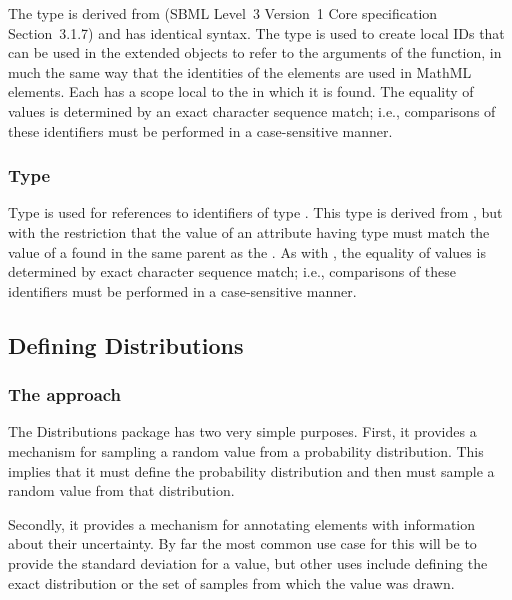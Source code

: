 \documentclass[draftspec]{sbmlpkgspec}
\newcommand{\fixttspace}{\hspace*{1pt}}
\newcommand{\sbmlthreecore}{SBML Level~3 Version~1 Core\xspace}
\newcommand{\distrib}{Distributions\xspace}
\begin{document}
The type  is derived from  (\sbmlthreecore specification Section~3.1.7) and has identical syntax.  The  type is used to create local IDs that can be used in the extended \FunctionDefinition objects to refer to the arguments of the function, in much the same way that the identities of the  elements are used in MathML  elements.  Each  has a scope local to the \FunctionDefinition in which it is found.  The
equality of  values is determined by an exact
character sequence match; i.e., comparisons of these identifiers must be
performed in a case-sensitive manner.


\subsubsection{Type \fixttspace{}}
\label{primtype-portidref}

Type  is used for references to
identifiers of type .  This type is derived from
, but with the restriction that the value of an
attribute having type  must match the value of a
 found in the same parent \FunctionDefinition as the
.  As with , the equality of
 values is determined by exact character sequence
match; i.e., comparisons of these identifiers must be performed in a
case-sensitive manner.



\subsection{Defining Distributions}

\subsubsection{The approach}

The \distrib package has two very simple purposes. First, it provides a
mechanism for sampling a random value from a probability
distribution. This implies that it must define the probability distribution and then must sample a
random value from that distribution.

Secondly, it provides a mechanism for annotating elements with information about their uncertainty.  By far the most common use case for this will be to provide the standard deviation for a value, but other uses include defining the exact distribution or the set of samples from which the value was drawn.
\end{document}
